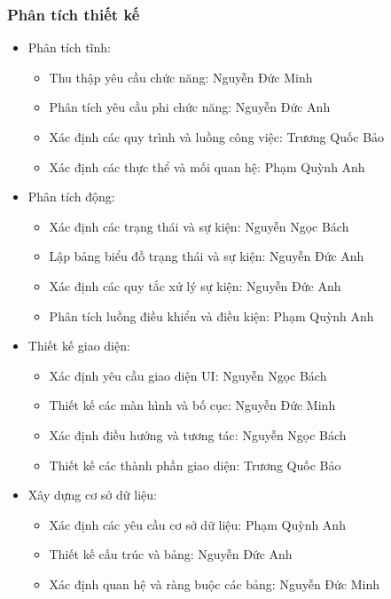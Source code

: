 \documentclass[12pt]{article}
\begin{document}
\subsubsection{Phân tích thiết kế}
\begin{itemize}[label=-, leftmargin=1cm]
    \item Phân tích tĩnh:
    \begin{itemize}[label=+, leftmargin=1cm]
        \item Thu thập yêu cầu chức năng: Nguyễn Đức Minh
        \item Phân tích yêu cầu phi chức năng: Nguyễn Đức Anh
        \item Xác định các quy trình và luồng công việc: Trương Quốc Bảo
        \item Xác định các thực thể và mối quan hệ: Phạm Quỳnh Anh
    \end{itemize}
    \item Phân tích động: 
    \begin{itemize}[label=+, leftmargin=1cm]
        \item Xác định các trạng thái và sự kiện: Nguyễn Ngọc Bách
        \item Lập bảng biểu đồ trạng thái và sự kiện: Nguyễn Đức Anh
        \item Xác định các quy tắc xử lý sự kiện: Nguyễn Đức Anh
        \item Phân tích luồng điều khiển và điều kiện: Phạm Quỳnh Anh
    \end{itemize}
    \item Thiết kế giao diện: 
    \begin{itemize}[label=+, leftmargin=1cm]
        \item Xác định yêu cầu giao diện UI: Nguyễn Ngọc Bách
        \item Thiết kế các màn hình và bố cục: Nguyễn Đức Minh
        \item Xác định điều hướng và tương tác: Nguyễn Ngọc Bách
        \item Thiết kế các thành phần giao diện: Trương Quốc Bảo
    \end{itemize}
    \item Xây dựng cơ sở dữ liệu: 
    \begin{itemize}[label=+, leftmargin=1cm]
        \item Xác định các yêu cầu cơ sở dữ liệu: Phạm Quỳnh Anh
        \item Thiết kế cấu trúc và bảng: Nguyễn Đức Anh
        \item Xác định quan hệ và ràng buộc các bảng: Nguyễn Đức Minh

\end{itemize}
\end{itemize}
\end{document}
